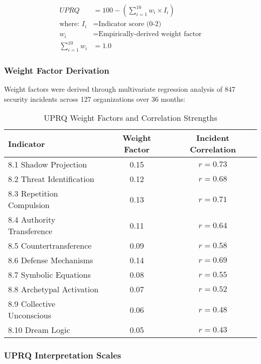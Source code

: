 \documentclass[11pt,a4paper]{article}
\begin{document}
\begin{align}
UPRQ &= 100 - \left(\sum_{i=1}^{10} w_i \times I_i\right) \\
\text{where: } I_i &= \text{Indicator score (0-2)} \\
w_i &= \text{Empirically-derived weight factor} \\
\sum_{i=1}^{10} w_i &= 1.0
\end{align}

\subsubsection{Weight Factor Derivation}

Weight factors were derived through multivariate regression analysis of 847 security incidents across 127 organizations over 36 months:

\begin{table}[H]
\centering
\caption{UPRQ Weight Factors and Correlation Strengths}
\begin{tabular}{lcc}
\toprule
Indicator & Weight Factor & Incident Correlation \\
\midrule
8.1 Shadow Projection & 0.15 & $r = 0.73$ \\
8.2 Threat Identification & 0.12 & $r = 0.68$ \\
8.3 Repetition Compulsion & 0.13 & $r = 0.71$ \\
8.4 Authority Transference & 0.11 & $r = 0.64$ \\
8.5 Countertransference & 0.09 & $r = 0.58$ \\
8.6 Defense Mechanisms & 0.14 & $r = 0.69$ \\
8.7 Symbolic Equations & 0.08 & $r = 0.55$ \\
8.8 Archetypal Activation & 0.07 & $r = 0.52$ \\
8.9 Collective Unconscious & 0.06 & $r = 0.48$ \\
8.10 Dream Logic & 0.05 & $r = 0.43$ \\
\bottomrule
\end{tabular}
\end{table}

\subsubsection{UPRQ Interpretation Scales}
\end{document}
